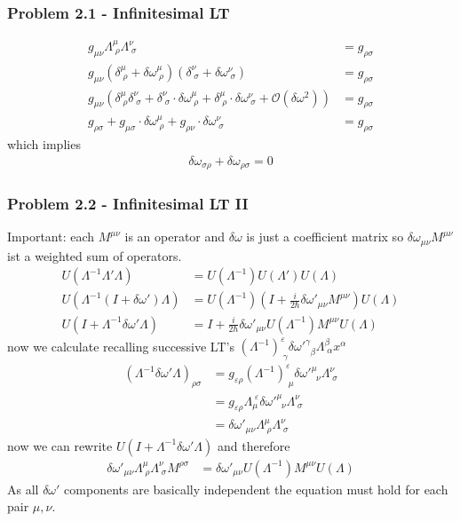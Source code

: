 \documentclass[10pt,a4paper]{article}
\theoremstyle{definition}
\begin{document}
\subsubsection{Problem 2.1 - Infinitesimal LT}
\begin{align}
g_{\mu\nu}\Lambda^\mu_{\;\rho}\Lambda^\nu_{\;\sigma}&=g_{\rho\sigma}\\
g_{\mu\nu}\left(\delta^\mu_{\;\rho}+\delta\omega^\mu_{\;\rho}\right)\left(\delta^\nu_{\;\sigma}+\delta\omega^\nu_{\;\sigma}\right)&=g_{\rho\sigma}\\
g_{\mu\nu}\left(\delta^\mu_{\;\rho}\delta^\nu_{\;\sigma}+\delta^\nu_{\;\sigma}\cdot\delta\omega^\mu_{\;\rho}+\delta^\mu_{\;\rho}\cdot\delta\omega^\nu_{\;\sigma}+\mathcal{O}(\delta\omega^2)\right)&=g_{\rho\sigma}\\
g_{\rho\sigma}+g_{\mu\sigma}\cdot\delta\omega^\mu_{\;\rho}+g_{\rho\nu}\cdot\delta\omega^\nu_{\;\sigma}&=g_{\rho\sigma}
\end{align}
which implies
\begin{align}
\delta\omega_{\sigma\rho}+\delta\omega_{\rho\sigma}=0
\end{align}

\subsubsection{Problem 2.2 - Infinitesimal LT II}
Important: each $M^{\mu\nu}$ is an operator and $\delta\omega$ is just a coefficient matrix so $\delta\omega _{\mu\nu}M^{\mu\nu}$ ist a weighted sum of operators.
\begin{align}
U(\Lambda^{-1}\Lambda'\Lambda)&=U(\Lambda^{-1})U(\Lambda')U(\Lambda)\\
U(\Lambda^{-1}(I+\delta\omega')\Lambda)&=U(\Lambda^{-1})\left(I+\frac{i}{2\hbar}\delta\omega'_{\mu\nu}M^{\mu\nu}\right)U(\Lambda)\\
U(I+\Lambda^{-1}\delta\omega'\Lambda)&=I+\frac{i}{2\hbar}\delta\omega'_{\mu\nu}U(\Lambda^{-1})M^{\mu\nu}U(\Lambda)
\end{align}
now we calculate recalling successive LT's $(\Lambda^{-1})^{\varepsilon}_{\;\gamma}\delta\omega'^\gamma_{\;\;\beta}\Lambda^\beta_{\;\alpha}x^\alpha$
\begin{align}
(\Lambda^{-1}\delta\omega'\Lambda)_{\rho\sigma}
&=g_{\varepsilon\rho}(\Lambda^{-1})^{\varepsilon}_{\;\mu}\delta\omega'^\mu_{\;\;\nu}\Lambda^\nu_{\;\sigma}\\
&=g_{\varepsilon\rho}\Lambda^{\;\varepsilon}_{\mu}\delta\omega'^\mu_{\;\;\nu}\Lambda^\nu_{\;\sigma}\\
&=\delta\omega'_{\mu\nu}\Lambda^{\mu}_{\;\rho}\Lambda^\nu_{\;\sigma}
\end{align}
now we can rewrite $U(I+\Lambda^{-1}\delta\omega'\Lambda)$ and therefore
\begin{align}
\delta\omega'_{\mu\nu}\Lambda^{\mu}_{\;\rho}\Lambda^\nu_{\;\sigma}M^{\rho\sigma}&=\delta\omega'_{\mu\nu}U(\Lambda^{-1})M^{\mu\nu}U(\Lambda)
\end{align}
As all $\delta\omega'$ components are basically independent the equation must hold for each pair $\mu,\nu$.
\end{document}
